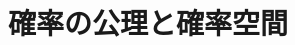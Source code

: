 \documentclass[../../topic_probability-statistics]{subfiles}
\begin{document}
\chapter{確率の公理と確率空間}


\end{document}
